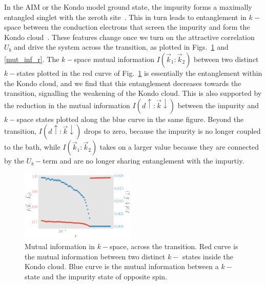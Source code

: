 \documentclass[reprint,superscriptaddress,floatfix]{revtex4-2}
\begin{document}
In the AIM or the Kondo model ground state, the impurity forms a maximally entangled singlet with the zeroth site~\cite{wilson1975,hewson1993,hrk_wilson_1980}.
This in turn leads to entanglement in \(k-\)space between the conduction electrons that screen the impurity and form the Kondo cloud~\cite{anirban_kondo}.
These features change once we turn on the attractive correlation \(U_b\) and drive the system across the transition, as plotted in Figs.~\ref{mut_inf_k} and \ref{mut_inf_r}.
The \(k-\)space mutual information \(I(\vec k_1:\vec k_2)\) between two distinct \(k-\)states plotted in the red curve of Fig.~\ref{mut_inf_k} is essentially the entanglement within the Kondo cloud, and we find that this entanglement decreases towards the transition, signalling the weakening of the Kondo cloud.
This is also supported by the reduction in the mutual information \(I(d \uparrow: \vec k \downarrow)\) between the impurity and \(k-\)space states plotted along the blue curve in the same figure. Beyond the transition, \(I(d \uparrow: \vec k \downarrow)\) drops to zero, because the impurity is no longer coupled to the bath, while \(I(\vec k_1:\vec k_2)\) takes on a larger value because they are connected by the \(U_b-\)term and are no longer sharing entanglement with the impurtiy. 

\begin{figure}[!htb]
\includegraphics[width=0.49\textwidth]{../figures/I_k.pdf}
\caption{Mutual information in \(k-\)space, across the transition. Red curve is the mutual information between two distinct \(k-\) states inside the Kondo cloud. Blue curve is the mutual information between a \(k-\)state and the impurity state of opposite spin.}
\label{mut_inf_k}
\end{figure}
\end{document}
